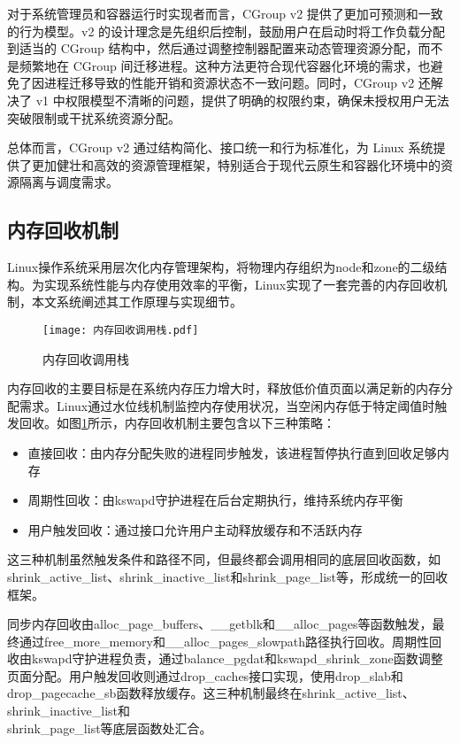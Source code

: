 对于系统管理员和容器运行时实现者而言，CGroup v2 提供了更加可预测和一致的行为模型。v2 的设计理念是先组织后控制，鼓励用户在启动时将工作负载分配到适当的 CGroup 结构中，然后通过调整控制器配置来动态管理资源分配，而不是频繁地在 CGroup 间迁移进程。这种方法更符合现代容器化环境的需求，也避免了因进程迁移导致的性能开销和资源状态不一致问题。同时，CGroup v2 还解决了 v1 中权限模型不清晰的问题，提供了明确的权限约束，确保未授权用户无法突破限制或干扰系统资源分配。

总体而言，CGroup v2 通过结构简化、接口统一和行为标准化，为 Linux 系统提供了更加健壮和高效的资源管理框架，特别适合于现代云原生和容器化环境中的资源隔离与调度需求。

\subsection{内存回收机制}
\label{sec:Linux内存回收机制}

Linux操作系统采用层次化内存管理架构，将物理内存组织为node和zone的二级结构。为实现系统性能与内存使用效率的平衡，Linux实现了一套完善的内存回收机制，本文系统阐述其工作原理与实现细节。

\begin{figure}[htb]
    \centering
    \texttt{[image: 内存回收调用栈.pdf]}
    \caption{内存回收调用栈}
    \label{fig:memory_reclaim_callgraph}
\end{figure}

内存回收的主要目标是在系统内存压力增大时，释放低价值页面以满足新的内存分配需求。Linux通过水位线机制监控内存使用状况，当空闲内存低于特定阈值时触发回收。如图\ref{fig:memory_reclaim_callgraph}所示，内存回收机制主要包含以下三种策略：

\begin{itemize}
    \item 直接回收：由内存分配失败的进程同步触发，该进程暂停执行直到回收足够内存
    \item 周期性回收：由kswapd守护进程在后台定期执行，维持系统内存平衡
    \item 用户触发回收：通过接口允许用户主动释放缓存和不活跃内存
\end{itemize}

这三种机制虽然触发条件和路径不同，但最终都会调用相同的底层回收函数，如shrink\_active\_list、shrink\_inactive\_list和shrink\_page\_list等，形成统一的回收框架。

同步内存回收由alloc\_page\_buffers、\_\_getblk和\_\_alloc\_pages等函数触发，最终通过free\_more\_memory和\_\_alloc\_pages\_slowpath路径执行回收。周期性回收由kswapd守护进程负责，通过balance\_pgdat和kswapd\_shrink\_zone函数调整页面分配。用户触发回收则通过drop\_caches接口实现，使用drop\_slab和drop\_pagecache\_sb函数释放缓存。这三种机制最终在shrink\_active\_list、shrink\_inactive\_list和\\shrink\_page\_list等底层函数处汇合。

